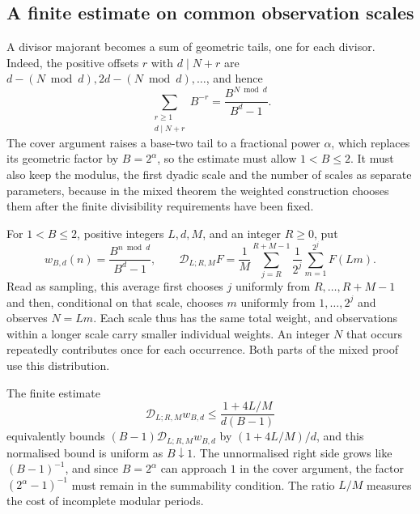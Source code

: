 \subsection{A finite estimate on common observation scales}\label{sec:257-common-kernel}
A divisor majorant becomes a sum of geometric tails, one for each
divisor. Indeed, the positive offsets $r$ with $d\mid N+r$ are
$d-(N\bmod d),2d-(N\bmod d),\ldots$, and hence
\[
 \sum_{\substack{r\ge1\\d\mid N+r}}B^{-r}
 =\frac{B^{N\bmod d}}{B^d-1}.
\]
The cover argument raises a base-two tail to a fractional power $\alpha$,
which replaces its geometric factor by $B=2^\alpha$, so the estimate must
allow $1<B\le2$. It must also keep the modulus, the first dyadic scale and
the number of scales as separate parameters, because in the mixed theorem
the weighted construction chooses them after the finite divisibility
requirements have been fixed.

For $1<B\le2$, positive integers $L,d,M$, and an integer $R\ge0$, put
\[
 w_{B,d}(n)=\frac{B^{n\bmod d}}{B^d-1},\qquad
 \mathscr D_{L;R,M}F
 =\frac1M\sum_{j=R}^{R+M-1}\frac1{2^j}
      \sum_{m=1}^{2^j}F(Lm).
\]
Read as sampling, this average first chooses $j$ uniformly from
$R,\ldots,R+M-1$ and then, conditional on that scale, chooses $m$
uniformly from $1,\ldots,2^j$ and observes $N=Lm$. Each scale thus has
the same total weight, and observations within a longer scale carry
smaller individual weights. An integer $N$ that occurs repeatedly
contributes once for each occurrence. Both parts of the mixed proof use
this distribution.

The finite estimate
\begin{equation}
 \mathscr D_{L;R,M}w_{B,d}
 \le\frac{1+4L/M}{d(B-1)}
 \label{eq:257-mixed-finite-kernel}
\end{equation}
equivalently bounds $(B-1)\mathscr D_{L;R,M}w_{B,d}$ by
$(1+4L/M)/d$, and this normalised bound is uniform as $B\downarrow1$.
The unnormalised right side grows like $(B-1)^{-1}$, and since
$B=2^\alpha$ can approach $1$ in the cover argument, the factor
$(2^\alpha-1)^{-1}$ must remain in the summability condition.
The ratio $L/M$ measures the cost of incomplete modular periods.

